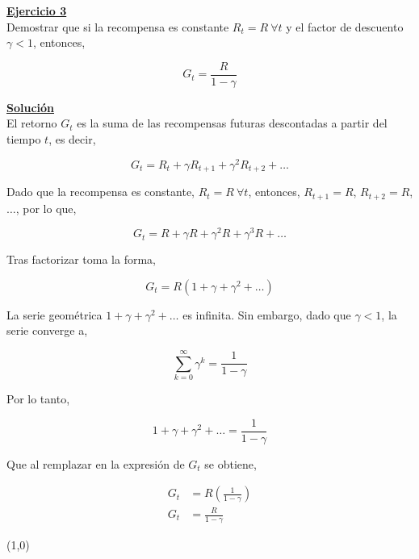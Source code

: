 \indent\underline{\textbf{Ejercicio 3}}\\
Demostrar que si la recompensa es constante $R_t = R \ \forall t$ y el factor de descuento $\gamma < 1$, entonces,

\[
    G_t = \frac{R}{1 - \gamma}
\]

\indent\underline{\textbf{Solución}}\\
El retorno $G_t$ es la suma de las recompensas futuras descontadas a partir del tiempo $t$, es decir,

\[
    G_t = R_t + \gamma R_{t+1} + \gamma^2 R_{t+2} + \ldots
\]

Dado que la recompensa es constante, $R_t = R \ \forall t$, entonces, $R_{t+1}=R$, $R_{t+2}=R$, $\ldots$, por lo que,

\[
    G_t = R + \gamma R + \gamma^2 R + \gamma^3 R + \ldots
\]

Tras factorizar toma la forma,

\[
    G_t = R(1 + \gamma + \gamma^2 + \ldots)
\]

La serie geométrica $1 + \gamma + \gamma^2 + \ldots$  es infinita. Sin embargo, dado que $\gamma < 1$, la serie converge a,

\[
    \sum_{k=0}^{\infty} \gamma^k = \frac{1}{1 - \gamma}
\]

Por lo tanto,

\[
    1 + \gamma + \gamma^2 + \ldots = \frac{1}{1 - \gamma}
\]

Que al remplazar en la expresión de $G_t$ se obtiene,

\begin{align*}
    G_t &= R \left(  \frac{1}{1 - \gamma} \right) \\
    G_t &= \frac{R}{1 - \gamma}
\end{align*}

\line(1,0){\textwidth}
